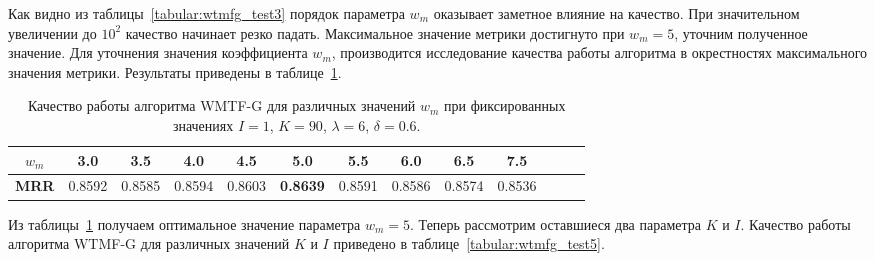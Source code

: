     Как видно из таблицы~\ref{tabular:wtmfg_test3} порядок параметра $w_m$ оказывает заметное влияние на качество. При значительном увеличении до $10^2$ качество начинает резко падать.
    Максимальное значение метрики достигнуто при $w_m=5$, уточним полученное значение.
    Для уточнения значения коэффициента $w_m$, производится исследование качества работы алгоритма в окрестностях максимального значения метрики.
    Результаты приведены в таблице~\ref{tabular:wtmfg_test4}.

    \begin{table}[ht!]
        \caption{Качество работы алгоритма WMTF-G для различных значений $w_m$ при фиксированных значениях $I=1$, $K=90$, $\lambda=6$, $\delta=0.6$. \bigskip}
        \centering

        \label{tabular:wtmfg_test4}
        \begin{tabular}{|c|c|c|c|c|c|c|c|c|c|c|c|c|} \hline
            $w_m$ & 3.0 & 3.5 & 4.0 & 4.5 & 5.0 & 5.5 & 6.0 & 6.5 & 7.5 \\ \hline
            \bf{MRR} & 0.8592 & 0.8585 & 0.8594 & 0.8603 & \bf{0.8639} & 0.8591 & 0.8586 & 0.8574 & 0.8536 \\ \hline

        \end{tabular}
    \end{table}

    Из таблицы~\ref{tabular:wtmfg_test4} получаем оптимальное значение параметра $w_m=5$.
    Теперь рассмотрим оставшиеся два параметра $K$ и $I$. Качество работы алгоритма WTMF-G для различных значений $K$ и $I$ приведено в таблице~\ref{tabular:wtmfg_test5}.

